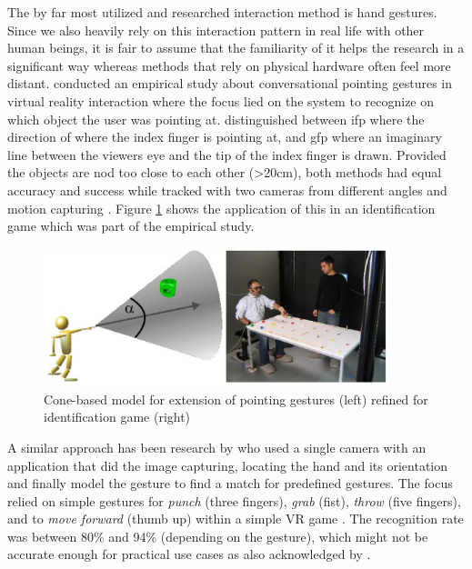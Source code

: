 The by far most utilized and researched interaction method is hand gestures. Since we also heavily rely on this interaction pattern in real life with other human beings, it is fair to assume that the familiarity of it helps the research in a significant way whereas methods that rely on physical hardware often feel more distant. \newline
\cite{Pfeiffer2008} conducted an empirical study about conversational pointing gestures in virtual reality interaction where the focus lied on the system to recognize on which object the user was pointing at. \cite{Pfeiffer2008} distinguished between \gls{ifp} where the direction of where the index finger is pointing at, and \gls{gfp} where an imaginary line between the viewers eye and the tip of the index finger is drawn. Provided the objects are nod too close to each other (>20cm), both methods had equal accuracy and success while tracked with two cameras from different angles and motion capturing \citep{Pfeiffer2008}. Figure \ref{fig:pointinggesture} shows the application of this in an identification game which was part of the empirical study.
\begin{figure}[h]
	\begin{center}
		\includegraphics[width=10cm]{03_Figures/05_LitReview/Pfeiffer2008_Pointing.png}
		\caption[Cone-based model for extension of pointing gestures refined for identification game]{Cone-based model for extension of pointing gestures (left) refined for identification game (right) \citep{Pfeiffer2008}}
		\label{fig:pointinggesture}
	\end{center}
\end{figure}
\newline
A similar approach has been research by \cite{Rautaray2011} who used a single camera with an application that did the image capturing, locating the hand and its orientation and finally model the gesture to find a match for predefined gestures. The focus relied on simple gestures for \textit{punch} (three fingers), \textit{grab} (fist), \textit{throw} (five fingers), and to \textit{move forward} (thumb up) within a simple VR game \citep{Rautaray2011}. The recognition rate was between 80\% and 94\% (depending on the gesture), which might not be accurate enough for practical use cases as also acknowledged by \cite{Rautaray2011}. \newline
